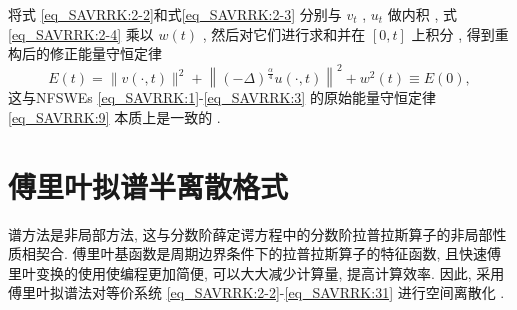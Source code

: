 将式 \eqref{eq_SAVRRK:2-2}和式\eqref{eq_SAVRRK:2-3} 分别与 $v_t$  , $u_t$ 做内积 , 
式\eqref{eq_SAVRRK:2-4} 乘以 $w(t)$ , 然后对它们进行求和并在 $[0 , t]$ 上积分 , 得到重构后的修正能量守恒定律
\begin{equation}
E(t)=\|v(\cdot , t)\|^2+\left\|(-\Delta)^{\frac{\alpha}{4}} u(\cdot , t)\right\|^{2}+w^2(t) \equiv E(0) , 
\end{equation}
这与NFSWEs \eqref{eq_SAVRRK:1}-\eqref{eq_SAVRRK:3} 的原始能量守恒定律 \eqref{eq_SAVRRK:9} 本质上是一致的 . 

\section{傅里叶拟谱半离散格式}\label{Section_SAVRRK: 3}

谱方法是非局部方法, 这与分数阶薛定谔方程中的分数阶拉普拉斯算子的非局部性质相契合.
傅里叶基函数是周期边界条件下的拉普拉斯算子的特征函数, 且快速傅里叶变换的使用使编程更加简便, 可以大大减少计算量, 提高计算效率.
因此, 采用傅里叶拟谱法对等价系统 \eqref{eq_SAVRRK:2-2}-\eqref{eq_SAVRRK:31} 进行空间离散化 . 

